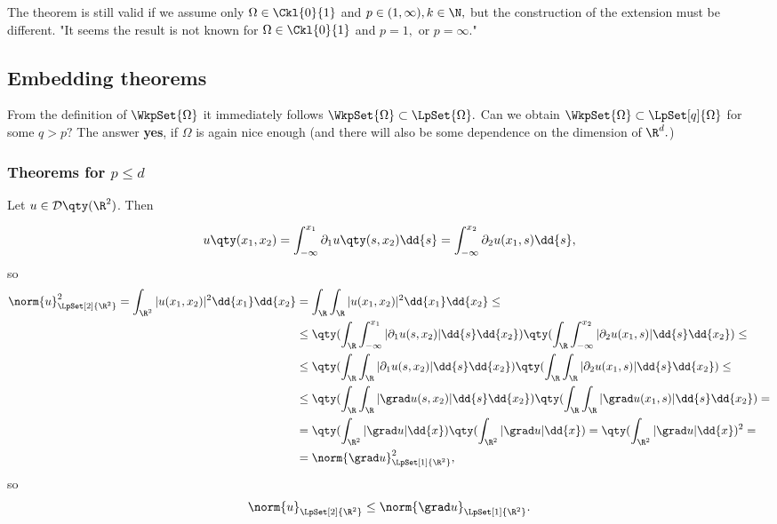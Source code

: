 \begin{remark}
	The theorem is still valid if we assume only $\Omega \in \Ckl{0}{1}$ and $p \in (1,\infty), k \in \N,$ but the construction of the extension must be different. "It seems the result is not known for $\Omega \in \Ckl{0}{1}$ and $p = 1,$ or $p = \infty.$"
\end{remark}

\subsection{Embedding theorems}
\label{sec:embedding}

From the definition of $\WkpSet{\Omega}$ it immediately follows $\WkpSet{\Omega} \subset \LpSet{\Omega}.$ Can we obtain $\WkpSet{\Omega} \subset \LpSet[q]{\Omega}$ for some $q > p?$ The answer \textbf{yes}, if $\Omega$ is again nice enough (and there will also be some dependence on the dimension of $\R^{d}.$)

\subsubsection{Theorems for $p \leq d$}
\label{sec:embedding_p_leq_q}

\begin{example}
	Let $u \in \mathcal{D}\qty(\R^2)$. Then 

	\begin{equation*}
		u\qty(x_1,x_2) = \int_{-\infty}^{x_1} \partial_{1}u\qty(s,x_2)\dd{s} = \int_{-\infty}^{x_2} \partial_{2}u(x_1,s)\dd{s},
	\end{equation*}
	so 
	\begin{align*}
		\norm{u}_{\LpSet[2]{\R^{2}}}^{2} = \int_{\R^2}|u(x_1,x_2)|^{2}\dd{x_1} \dd{x_2} &= \int_{\R}\int_{\R}|u(x_1,x_2)|^{2}\dd{x_1}\dd{x_2}\leq \\
		&\leq \qty(\int_{\R}\int_{-\infty}^{x_1}|\partial_{1}u(s,x_2)|\dd{s}\dd{x_2}) \qty(\int_{\R}\int_{-\infty}^{x_2}|\partial_{2} u(x_1,s)|\dd{s}\dd{x_2}) \leq \\
		&\leq \qty(\int_{\R}\int_{\R}|\partial_{1}u(s,x_2)|\dd{s}\dd{x_2})\qty(\int_{\R}\int_{\R}|\partial_{2}u(x_1,s)|\dd{s}\dd{x_2}) \leq \\
		& \leq \qty(\int_{\R}\int_{\R}|\grad u(s,x_2)|\dd{s}\dd{x_2})\qty(\int_{\R}\int_{\R}|\grad u(x_1,s)|\dd{s}\dd{x_2}) = \\
		& = \qty(\int_{\R^2}|\grad u|\dd{x}) \qty(\int_{\R^{2}}|\grad u|\dd{x}) = \qty(\int_{\R^{2}}|\grad u|\dd{x})^{2} = \\
		& = \norm{\grad u}_{\LpSet[1]{\R^{2}}}^{2},
	\end{align*}
	so
	\[
		\norm{u}_{\LpSet[2]{\R^{2}}} \leq \norm{\grad u}_{\LpSet[1]{\R^{2}}}.
	\]
\end{example}

